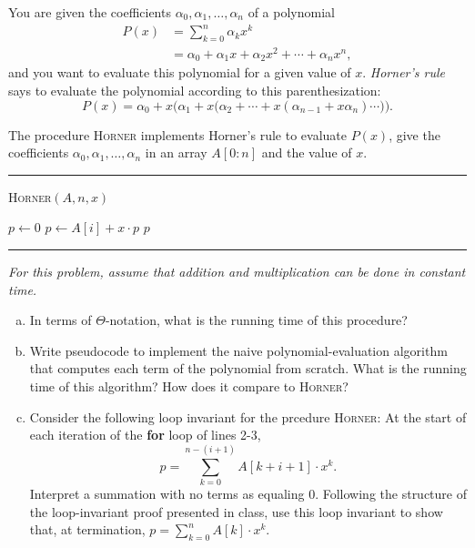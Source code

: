 \documentclass[11pt]{article}
\begin{document}
    \newpage
    \begin{tcolorbox}[title={Problem 4 (30 pts)}]
        You are given the coefficients $\alpha_0,\alpha_1,\ldots,\alpha_n$ of a polynomial
        \begin{align*}
            P(x) &= \sum_{k=0}^n \alpha_k x^k\\
            &= \alpha_0+\alpha_1x+\alpha_2x^2+\cdots+\alpha_nx^n,
        \end{align*}
        and you want to evaluate this polynomial for a given value of $x$. \emph{Horner's rule} says to evaluate the polynomial according to this parenthesization:
        \[
            P(x) = \alpha_0 + x \bigg(\alpha_1+x\Big(\alpha_2 +\cdots + x\left(\alpha_{n-1}+x\alpha_n\right)\cdots\Big)\bigg).
        \]
        
        The procedure \textsc{Horner} implements Horner's rule to evaluate $P(x)$, give the coefficients $\alpha_0,\alpha_1,\ldots,\alpha_n$ in an array $A[0:n]$ and the value of $x$.
        \bigskip
        
        \par\noindent\rule{\textwidth}{0.4pt}
        \smallskip        
        \textsc{Horner}$(A,n,x)$
        \begin{algorithmic}[1]
            \STATE $p\gets 0$
                \STATE $p \gets A[i]+x\cdot p$
            \ENDFOR
            \RETURN $p$
        \end{algorithmic}
        \vspace{-2mm}
        \par\noindent\rule{\textwidth}{0.4pt}
        
        {\it For this problem, assume that addition and multiplication can be done in constant time.}
        \begin{enumerate}[(a)]
            \item In terms of $\Theta$-notation, what is the running time of this procedure?
            \item Write pseudocode to implement the naive polynomial-evaluation algorithm that computes each term of the polynomial from scratch. What is the running time of this algorithm? How does it compare to \textsc{Horner}?
            \item Consider the following loop invariant for the prcedure \textsc{Horner}:\newline
            At the start of each iteration of the {\bf for} loop of lines 2-3,
            \[
            p = \sum_{k=0}^{n-(i+1)} A[k+i+1]\cdot x^k.
            \]
            Interpret a summation with no terms as equaling 0. Following the structure of the loop-invariant proof presented in class, use this loop invariant to show that, at termination, $p = \sum_{k=0}^n A[k] \cdot x^k$.
        \end{enumerate}
        
    \end{tcolorbox}
    
    
    
    \newpage \ 
    
    
    
\end{document}
